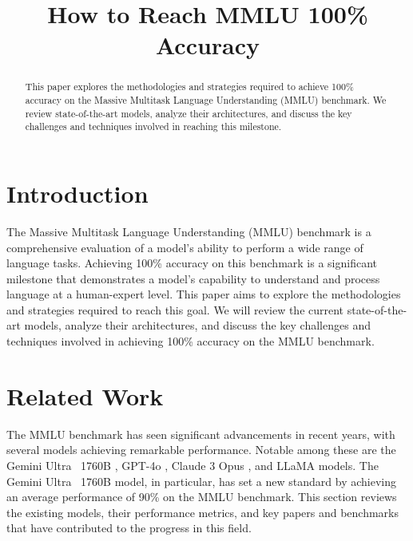 \documentclass[conference]{IEEEtran}
\title{How to Reach MMLU 100\% Accuracy}
\author{\IEEEauthorblockN{Devin AI, Kasinadhsarma}
\IEEEauthorblockA{Email: kaisnadhsarma@gmail.com}}
\begin{document}
\maketitle

\begin{abstract}
This paper explores the methodologies and strategies required to achieve 100\% accuracy on the Massive Multitask Language Understanding (MMLU) benchmark. We review state-of-the-art models, analyze their architectures, and discuss the key challenges and techniques involved in reaching this milestone.
\end{abstract}

\section{Introduction}
The Massive Multitask Language Understanding (MMLU) benchmark is a comprehensive evaluation of a model's ability to perform a wide range of language tasks. Achieving 100\% accuracy on this benchmark is a significant milestone that demonstrates a model's capability to understand and process language at a human-expert level. This paper aims to explore the methodologies and strategies required to reach this goal. We will review the current state-of-the-art models, analyze their architectures, and discuss the key challenges and techniques involved in achieving 100\% accuracy on the MMLU benchmark.

\section{Related Work}
The MMLU benchmark has seen significant advancements in recent years, with several models achieving remarkable performance. Notable among these are the Gemini Ultra ~1760B \cite{gemini2023ultra}, GPT-4o \cite{openai2023gpt4}, Claude 3 Opus \cite{anthropic2023claude3}, and LLaMA \cite{touvron2023llama} models. The Gemini Ultra ~1760B model, in particular, has set a new standard by achieving an average performance of 90\% on the MMLU benchmark. This section reviews the existing models, their performance metrics, and key papers and benchmarks that have contributed to the progress in this field.
\end{document}
